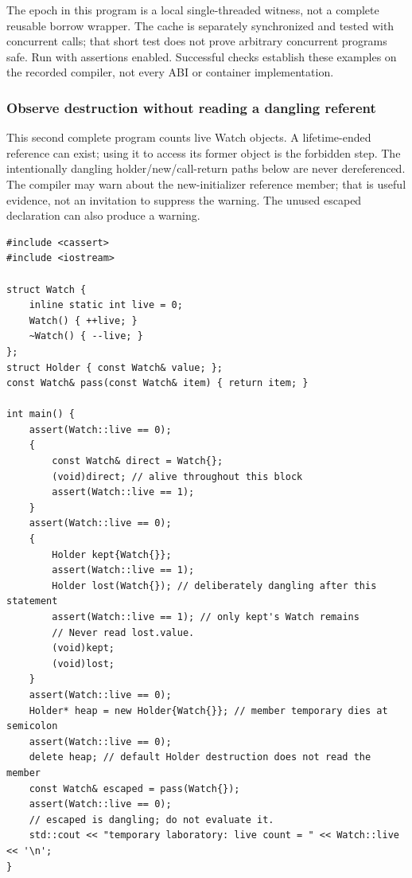 The epoch in this program is a local single-threaded witness, not a complete reusable borrow wrapper. The cache is separately synchronized and tested with concurrent calls; that short test does not prove arbitrary concurrent programs safe. Run with assertions enabled. Successful checks establish these examples on the recorded compiler, not every ABI or container implementation.

\subsubsection{Observe destruction without reading a dangling referent}\label{observe-destruction-without-reading-a-dangling-referent}

This second complete program counts live Watch objects. A lifetime-ended reference can exist; using it to access its former object is the forbidden step. The intentionally dangling holder/new/call-return paths below are never dereferenced. The compiler may warn about the new-initializer reference member; that is useful evidence, not an invitation to suppress the warning. The unused escaped declaration can also produce a warning.

\begin{verbatim}
#include <cassert>
#include <iostream>

struct Watch {
    inline static int live = 0;
    Watch() { ++live; }
    ~Watch() { --live; }
};
struct Holder { const Watch& value; };
const Watch& pass(const Watch& item) { return item; }

int main() {
    assert(Watch::live == 0);
    {
        const Watch& direct = Watch{};
        (void)direct; // alive throughout this block
        assert(Watch::live == 1);
    }
    assert(Watch::live == 0);
    {
        Holder kept{Watch{}};
        assert(Watch::live == 1);
        Holder lost(Watch{}); // deliberately dangling after this statement
        assert(Watch::live == 1); // only kept's Watch remains
        // Never read lost.value.
        (void)kept;
        (void)lost;
    }
    assert(Watch::live == 0);
    Holder* heap = new Holder{Watch{}}; // member temporary dies at semicolon
    assert(Watch::live == 0);
    delete heap; // default Holder destruction does not read the member
    const Watch& escaped = pass(Watch{});
    assert(Watch::live == 0);
    // escaped is dangling; do not evaluate it.
    std::cout << "temporary laboratory: live count = " << Watch::live << '\n';
}
\end{verbatim}

